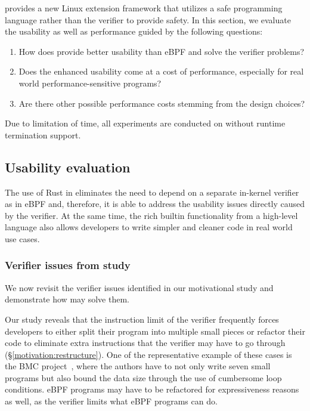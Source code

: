 \projname{} provides a new Linux extension framework that utilizes a safe
    programming language rather than the verifier to provide safety.
In this section, we evaluate the usability as well as performance guided by the
    following questions:
\begin{enumerate}
    \item How does \projname{} provide better usability than eBPF and solve the
        verifier problems?
    \item Does the enhanced usability come at a cost of performance, especially
        for real world performance-sensitive programs?
    \item Are there other possible performance costs stemming from the design
        choices?
\end{enumerate}

Due to limitation of time, all experiments are conducted on
    \projname{} without runtime termination support.

\subsection{Usability evaluation}
The use of Rust in \projname{} eliminates the need to depend on a separate
    in-kernel verifier as in eBPF and, therefore, it is able to address the
    usability issues directly caused by the verifier.
At the same time, the rich builtin functionality from a high-level language
    also allows developers to write simpler and cleaner code in real world use
    cases.

\subsubsection{Verifier issues from study}
We now revisit the verifier issues identified in our motivational study and
    demonstrate how \projname{} may solve them.

Our study reveals that the instruction limit of the verifier frequently
    forces developers to either split their program into multiple small pieces
    or refactor their code to eliminate extra instructions that the verifier
    may have to go through (\S\ref{motivation:restructure}).
One of the representative example of these cases is the BMC project~\cite{BMC},
    where the authors have to not only write seven small programs but also
    bound the data size through the use of cumbersome loop conditions.
eBPF programs may have to be refactored for expressiveness reasons as well,
    as the verifier limits what eBPF programs can do.

